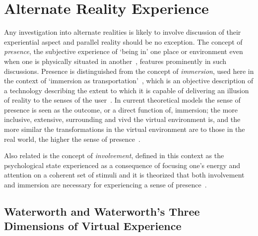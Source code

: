 
\section{Alternate Reality Experience}

\label{lit-review-presencec}
Any investigation into alternate realities is likely to involve discussion of their experiential aspect and parallel reality should be no exception. The concept of \textit{presence}, the subjective experience of `being in' one place or environment even when one is physically situated in another~\cite{Witmer1998}, features prominently in such discussions. Presence is distinguished from the concept of \textit{immersion}, used here in the context of `immersion as transportation'~\cite{Calleja2014}, which is an objective description of a technology describing the extent to which it is capable of delivering an illusion of reality to the senses of the user~\cite{Slater1997}. In current theoretical models the sense of presence is seen as the outcome, or a direct function of, immersion; the more inclusive, extensive, surrounding and vivd the virtual environment is, and the more similar the transformations in the virtual environment are to those in the real world, the higher the sense of presence~\cite{Constantin2003}.

Also related is the concept of \textit{involvement}, defined in this context as the psychological state experienced as a consequence of focusing one's energy and attention on a coherent set of stimuli and it is theorized that both involvement and immersion are necessary for experiencing a sense of presence~\cite{Witmer1998}.

\subsection{Waterworth and Waterworth's Three Dimensions of Virtual Experience}
\label{waterworthandwaterworth}
\newcommand{\presencefootnote}{\footnote{\textbf{Presence} in the context of this model is defined as a state of heightened perceptual processing of environmental stimuli (\textit{``a psychological focus on direct perceptual processing''}~\cite{Waterworth2001}) accompanied by lessened conceptual reasoning, covering cases both in which the environmental stimuli originate from the subject's immediate real surroundings (\textit{unmediated presence}) and when the environmental stimuli originate from a remote real environment, virtual environment or mixed reality environment (\textit{mediated presence})~\cite{Mantovani2010}.}}

